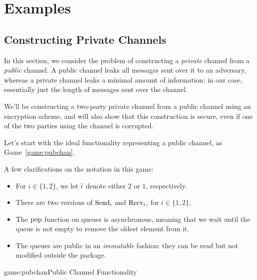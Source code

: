\section{Examples}

\subsection{Constructing Private Channels}

In this section, we consider the problem of constructing a \emph{private}
channel from a \emph{public} channel.
A public channel leaks all messages sent over it to an adversary,
whereas a private channel leaks a minimal amount of information:
in our case, essentially just the length of messages sent over the channel.

We'll be constructing a two-party private channel from a public channel
using an encryption scheme, and will also show that this construction is secure,
even if one of the two parties using the channel is corrupted.

Let's start with the ideal functionality representing a public channel,
as Game~\ref{game:pubchan}.

A few clarifications on the notation in this game:
\begin{itemize}
    \item For $i \in \{1, 2\}$, we let $\bar{\imath}$ denote either $2$ or $1$, respectively.
    \item There are two versions of $\text{Send}_i$ and $\text{Recv}_i$, for $i \in \{1, 2\}$.
    \item The $\text{pop}$ function on queues is asynchronous, meaning that we wait until the queue is not empty
    to remove the oldest element from it.
    \item The queues are public in an \emph{immutable} fashion: they can be read but not modified outside the package.
\end{itemize}

\begin{game}{game:pubchan}{Public Channel Functionality}
\end{game}

